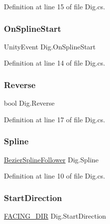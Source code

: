 Definition at line 15 of file Dig.\+cs.

\mbox{\label{class_dig_a81532022107f8a49340a38600d73f03e}} 
\subsubsection{\texorpdfstring{On\+Spline\+Start}{OnSplineStart}}
{\footnotesize\ttfamily Unity\+Event Dig.\+On\+Spline\+Start}



Definition at line 14 of file Dig.\+cs.

\mbox{\label{class_dig_a27228504e869fda59d4bafed8c1a7b40}} 
\subsubsection{\texorpdfstring{Reverse}{Reverse}}
{\footnotesize\ttfamily bool Dig.\+Reverse}



Definition at line 17 of file Dig.\+cs.

\mbox{\label{class_dig_accc036a410b9deba82251868996985ac}} 
\subsubsection{\texorpdfstring{Spline}{Spline}}
{\footnotesize\ttfamily \mbox{\hyperlink{class_bezier_spline_follower}{Bezier\+Spline\+Follower}} Dig.\+Spline}



Definition at line 10 of file Dig.\+cs.

\mbox{\label{class_dig_a1d6e052403f935b802289c4089818dd9}} 
\subsubsection{\texorpdfstring{Start\+Direction}{StartDirection}}
{\footnotesize\ttfamily \mbox{\hyperlink{_animal_8cs_a57d10208ebba781ae206546ada2002b6}{F\+A\+C\+I\+N\+G\+\_\+\+D\+IR}} Dig.\+Start\+Direction}



